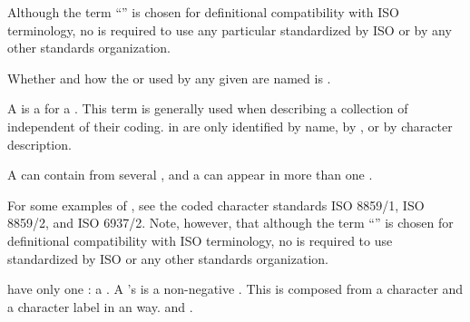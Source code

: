 Although
the term ``'' is chosen for 
definitional 
compatibility with ISO terminology, no  
is required to use any particular  standardized by ISO
or by any other standards organization.

Whether and how the  or  used by any given
 are named is .

\endsubsubsection%


A  is a  for a .
This term is generally used when describing a collection of 
independent of their coding.
 in  are only identified
    by name,
    by , or
    by character description.

A  can contain  from several
, and a  can appear in more than
one .

For some examples of , see the coded character standards
ISO 8859/1, ISO 8859/2, and ISO 6937/2.
Note, however, that although
the term ``'' is chosen for 
definitional 
compatibility with ISO terminology, no  
is required to use  standardized by ISO or any other 
standards organization.

\endsubsubsection%

\endsubSection%


 have only one  :
a .  A 's  is a non-negative .
This  is composed from a character  and a character label
in an  way.   and .

